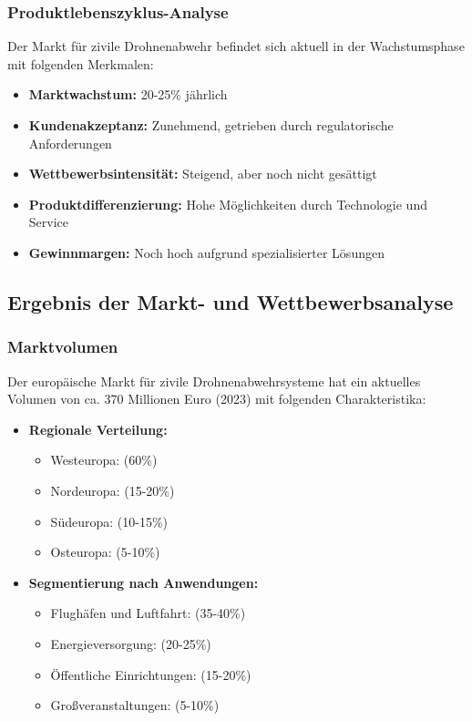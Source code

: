 \documentclass[11pt,a4paper]{article}
\begin{document}
\subsubsection*{Produktlebenszyklus-Analyse}
Der Markt für zivile Drohnenabwehr befindet sich aktuell in der Wachstumsphase mit folgenden Merkmalen:
\begin{itemize}
\item \textbf{Marktwachstum:} 20-25\% jährlich
\item \textbf{Kundenakzeptanz:} Zunehmend, getrieben durch regulatorische Anforderungen
\item \textbf{Wettbewerbsintensität:} Steigend, aber noch nicht gesättigt
\item \textbf{Produktdifferenzierung:} Hohe Möglichkeiten durch Technologie und Service
\item \textbf{Gewinnmargen:} Noch hoch aufgrund spezialisierter Lösungen
\end{itemize}

\subsection{Ergebnis der Markt- und Wettbewerbsanalyse}

\subsubsection*{Marktvolumen}

Der europäische Markt für zivile Drohnenabwehrsysteme hat ein aktuelles Volumen von ca. 370 Millionen Euro (2023) mit folgenden Charakteristika:

\begin{itemize}
\item \textbf{Regionale Verteilung:}
\begin{itemize}
\item Westeuropa: (60\%)
\item Nordeuropa: (15-20\%)
\item Südeuropa: (10-15\%)
\item Osteuropa: (5-10\%)
\end{itemize}

\item \textbf{Segmentierung nach Anwendungen:}
\begin{itemize}
\item Flughäfen und Luftfahrt: (35-40\%)
\item Energieversorgung: (20-25\%)
\item Öffentliche Einrichtungen: (15-20\%)
\item Großveranstaltungen: (5-10\%)
\end{itemize}
\end{itemize}
\end{document}
